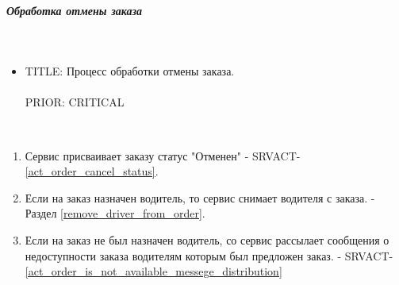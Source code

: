 \subparagraph{Обработка отмены заказа} \mbox{}\\

  \begin{itemize}

    \item {
      TITLE: Процесс обработки отмены заказа.\\
      \\
      PRIOR: CRITICAL\\
    }

  \end{itemize}

  \begin{alg}\label{cancel_order_alg} \mbox{}\\

    \begin{enumerate}

      \item Сервис присваивает заказу статус "Отменен" - SRVACT-\ref{act_order_cancel_status}.

      \item Если на заказ назначен водитель, то сервис снимает водителя с заказа. - Раздел \ref{remove_driver_from_order}.

      \item Если на заказ не был назначен водитель, со сервис рассылает сообщения о недоступности заказа водителям которым был предложен заказ. -  SRVACT-\ref{act_order_is_not_available_messege_distribution}

    \end{enumerate}

  \end{alg}